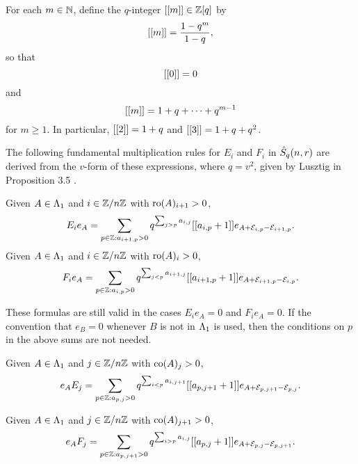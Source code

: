 \documentclass[a4paper, 11pt, twoside]{report}
\begin{document}
For each $m\in\mathbb{N}$, define the $q$-integer $[[m]]\in\mathbb{Z}[q]$ by
\begin{equation*}
[[m]] = \frac{1-q^m}{1-q},
\end{equation*}
so that
\begin{equation*}
[[0]] = 0
\end{equation*}
and
\begin{equation*}
[[m]] = 1+q+\cdots +q^{m-1}
\end{equation*}
for $m\geq 1$. In particular, $[[2]]=1+q$ and $[[3]]=1+q+q^2$.

The following fundamental multiplication rules for $E_i$ and $F_i$ in $\hat{S}_q(n,r)$ are derived from the $v$-form of these expressions, where $q=v^2$, given by Lusztig in Proposition 3.5 \cite{lusztig99}.

\begin{lemma}\label{lemma:fundamental-multiplication-rule}
Given $A\in\Lambda_1{}$ and $i\in\mathbb{Z}/{n \mathbb{Z}}$ with $\operatorname{ro}(A)_{i+1}>0$,
\begin{equation*}
E_ie_A = \sum_{p\in\mathbb{Z}:a_{i+1,p}>0} q^{\sum_{j>p}a_{i,j}} [[a_{i,p}+1]] e_{A+\mathcal{E}_{i,p} -\mathcal{E}_{i+1,p}}.
\end{equation*}
Given $A\in\Lambda_1{}$ and $i\in\mathbb{Z}/{n \mathbb{Z}}$ with $\operatorname{ro}(A)_i>0$,
\begin{equation*}
F_ie_A = \sum_{p\in\mathbb{Z}:a_{i,p}>0} q^{\sum_{j<p}a_{i+1,j}} [[a_{i+1,p}+1]] e_{A+\mathcal{E}_{i+1,p} -\mathcal{E}_{i,p}}.
\end{equation*}
\end{lemma}

These formulas are still valid in the cases $E_ie_A=0$ and $F_ie_A=0$. If the convention that $e_B = 0$ whenever $B$ is not in $\Lambda_1{}$ is used, then the conditions on $p$ in the above sums are not needed.

\begin{corollary}\label{corollary:fundamental-right-multiplication-rules}
Given $A\in\Lambda_1{}$ and $j\in\mathbb{Z}/{n \mathbb{Z}}$ with $\operatorname{co}(A)_{j}>0$,
\begin{equation*}
e_AE_j = \sum_{p\in\mathbb{Z}: a_{p,j}>0} q^{\sum_{i<p} a_{i,j+1}} [[a_{p,j+1}+1]] e_{A+\mathcal{E}_{p,j+1}-\mathcal{E}_{p,j}}.
\end{equation*}

Given $A\in\Lambda_1{}$ and $j\in\mathbb{Z}/{n \mathbb{Z}}$ with $\operatorname{co}(A)_{j+1}>0$,
\begin{equation*}
e_AF_j = \sum_{p\in\mathbb{Z}: a_{p,j+1}>0} q^{\sum_{i>p}a_{i,j}} [[a_{p,j}+1]] e_{A+\mathcal{E}_{p,j}-\mathcal{E}_{p,j+1}}.
\end{equation*}
\end{corollary}
\end{document}
